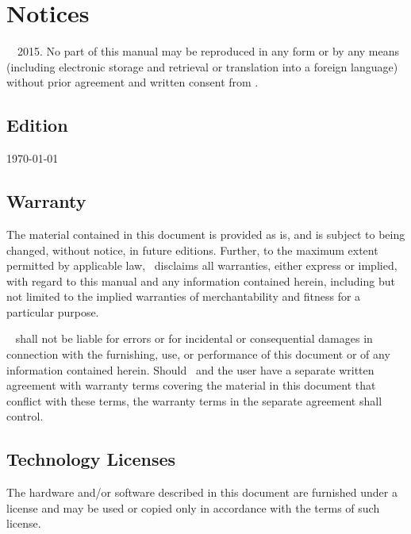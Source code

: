
\thispagestyle{empty}
\section*{Notices}
\textcopyright~\docAuthor~2015.
No part of this manual may be reproduced in any form or by any means
(including electronic storage and retrieval or translation into a
foreign language) without prior agreement and written consent from \docAuthor.

\subsection*{Edition}
\today

\subsection*{Warranty}
The material contained in this document is provided \glqq as is\grqq, and is subject to
being changed, without notice, in future editions. Further, to the maximum extent
permitted by applicable law, \docAuthor~disclaims all warranties, either express or
implied, with regard to this manual and any information contained herein,
including but not limited to the implied warranties of merchantability and fitness
for a particular purpose.

\docAuthor~ shall not be liable for errors or for incidental
or consequential damages in connection with the furnishing, use, or performance of
this document or of any information contained herein. Should \docAuthor~and
the user have a separate written agreement with warranty terms covering the material
in this document that conflict with these terms, the warranty terms in the
separate agreement shall control.

\subsection*{Technology Licenses}
The hardware and/or software described in this document are furnished under a
license and may be used or copied only in accordance with the terms of such license.


